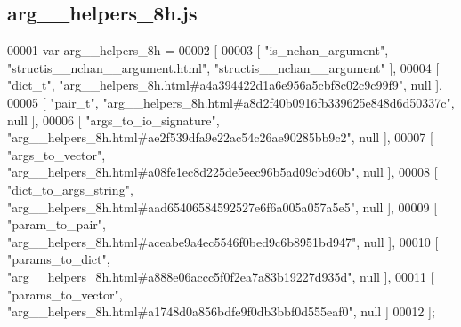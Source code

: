 \subsection{arg\+\_\+\+\_\+helpers\+\_\+8h.\+js}
\label{arg____helpers__8h_8js_source}

\begin{DoxyCode}
00001 var arg__helpers_8h =
00002 [
00003     [ \textcolor{stringliteral}{"is\_nchan\_argument"}, \textcolor{stringliteral}{"structis\_\_nchan\_\_argument.html"}, \textcolor{stringliteral}{"structis\_\_nchan\_\_argument"} ],
00004     [ \textcolor{stringliteral}{"dict\_t"}, \textcolor{stringliteral}{"arg\_\_helpers\_8h.html#a4a394422d1a6e956a5cbf8c02c9c99f9"}, null ],
00005     [ \textcolor{stringliteral}{"pair\_t"}, \textcolor{stringliteral}{"arg\_\_helpers\_8h.html#a8d2f40b0916fb339625e848d6d50337c"}, null ],
00006     [ \textcolor{stringliteral}{"args\_to\_io\_signature"}, \textcolor{stringliteral}{"arg\_\_helpers\_8h.html#ae2f539dfa9e22ac54c26ae90285bb9c2"}, null ],
00007     [ \textcolor{stringliteral}{"args\_to\_vector"}, \textcolor{stringliteral}{"arg\_\_helpers\_8h.html#a08fe1ec8d225de5eec96b5ad09cbd60b"}, null ],
00008     [ \textcolor{stringliteral}{"dict\_to\_args\_string"}, \textcolor{stringliteral}{"arg\_\_helpers\_8h.html#aad65406584592527e6f6a005a057a5e5"}, null ],
00009     [ \textcolor{stringliteral}{"param\_to\_pair"}, \textcolor{stringliteral}{"arg\_\_helpers\_8h.html#aceabe9a4ec5546f0bed9c6b8951bd947"}, null ],
00010     [ \textcolor{stringliteral}{"params\_to\_dict"}, \textcolor{stringliteral}{"arg\_\_helpers\_8h.html#a888e06accc5f0f2ea7a83b19227d935d"}, null ],
00011     [ \textcolor{stringliteral}{"params\_to\_vector"}, \textcolor{stringliteral}{"arg\_\_helpers\_8h.html#a1748d0a856bdfe9f0db3bbf0d555eaf0"}, null ]
00012 ];
\end{DoxyCode}
